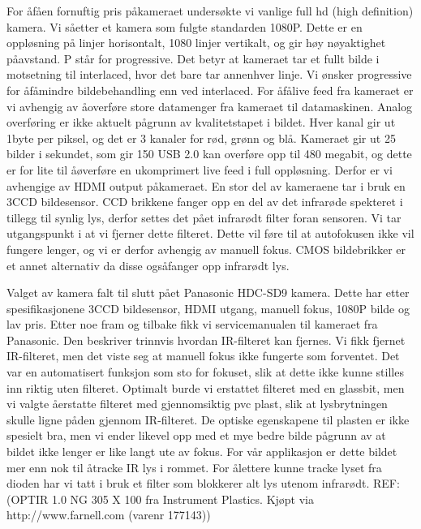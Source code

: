 		 
		For \aa \space f\aa \space en fornuftig pris p\aa \space kameraet unders\o kte vi vanlige full hd (high definition) kamera. Vi s\aa \space etter et kamera som fulgte standarden 1080P. Dette er en oppl\o sning p\aa {} linjer horisontalt, 1080 linjer vertikalt, og gir h\o y n\o yaktighet p\aa \space avstand. P st\aa r for progressive. Det betyr at kameraet tar et fullt bilde i motsetning til interlaced, hvor det bare tar annenhver linje. Vi \o nsker progressive for \aa \space f\aa \space mindre bildebehandling enn ved interlaced. For \aa \space f\aa \space live feed fra kameraet er vi avhengig av \aa \space overf\o re store datamenger fra kameraet til datamaskinen. Analog overf\o ring er ikke aktuelt p\aa \space grunn av kvalitetstapet i bildet. Hver kanal gir ut 1byte per piksel, og det er 3 kanaler for r\o d, gr\o nn og bl\aa . Kameraet gir ut 25 bilder i sekundet, som gir 150 USB 2.0 kan overf\o re opp til 480 megabit, og dette er for lite til \aa \space \o verf\o re en ukomprimert live feed i full oppl\o sning. Derfor er vi avhengige av HDMI output p\aa \space kameraet. En stor del av kameraene tar i bruk en 3CCD bildesensor. CCD brikkene fanger opp en del av det infrar\o de spekteret i tillegg til synlig lys, derfor settes det p\aa \space et infrar\o dt filter foran sensoren. Vi tar utgangspunkt i at vi fjerner dette filteret. Dette vil f\o re til at autofokusen ikke vil fungere lenger, og vi er derfor avhengig av manuell fokus. CMOS bildebrikker er et annet alternativ da disse ogs\aa \space fanger opp infrar\o dt lys.

		Valget av kamera falt til slutt p\aa \space et Panasonic HDC-SD9 kamera. Dette har etter spesifikasjonene 3CCD bildesensor, HDMI utgang, manuell fokus, 1080P bilde og lav pris. Etter noe fram og tilbake fikk vi servicemanualen til kameraet fra Panasonic. Den beskriver trinnvis hvordan IR-filteret kan fjernes. Vi fikk fjernet IR-filteret, men det viste seg at manuell fokus ikke fungerte som forventet. Det var en automatisert funksjon som sto for fokuset, slik at dette ikke kunne stilles inn riktig uten filteret. Optimalt burde vi erstattet filteret med en glassbit, men vi valgte \aa \space erstatte filteret med gjennomsiktig pvc plast, slik at lysbrytningen skulle ligne p\aa \space den gjennom IR-filteret. De optiske egenskapene til plasten er ikke spesielt bra, men vi ender likevel opp med et mye bedre bilde p\aa \space grunn av at bildet ikke lenger er like langt ute av fokus. For v\aa r applikasjon er dette bildet mer enn nok til \aa \space tracke IR lys i rommet. For \aa \space lettere kunne tracke lyset fra dioden har vi tatt i bruk et filter som blokkerer alt lys utenom infrar\o dt. REF: (OPTIR 1.0 NG 305 X 100 fra Instrument Plastics. Kj\o pt via http://www.farnell.com (varenr 177143))
		
